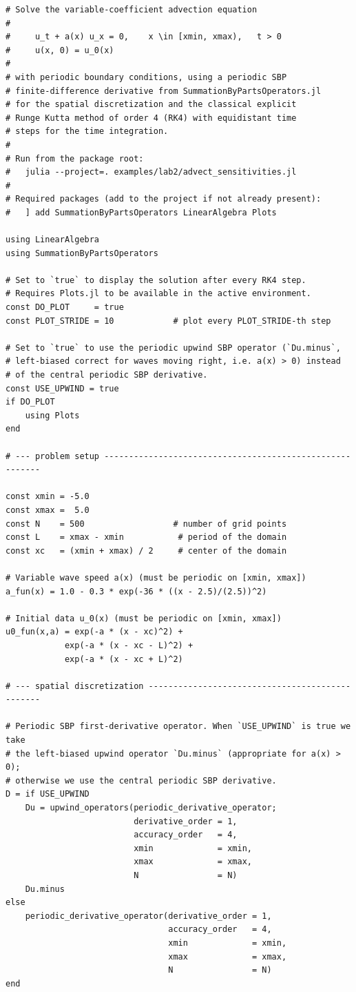 \documentclass[11pt]{report}
\begin{document}
\begin{verbatim}
# Solve the variable-coefficient advection equation
#
#     u_t + a(x) u_x = 0,    x \in [xmin, xmax),   t > 0
#     u(x, 0) = u_0(x)
#
# with periodic boundary conditions, using a periodic SBP
# finite-difference derivative from SummationByPartsOperators.jl
# for the spatial discretization and the classical explicit
# Runge Kutta method of order 4 (RK4) with equidistant time
# steps for the time integration.
#
# Run from the package root:
#   julia --project=. examples/lab2/advect_sensitivities.jl
#
# Required packages (add to the project if not already present):
#   ] add SummationByPartsOperators LinearAlgebra Plots

using LinearAlgebra
using SummationByPartsOperators

# Set to `true` to display the solution after every RK4 step.
# Requires Plots.jl to be available in the active environment.
const DO_PLOT     = true
const PLOT_STRIDE = 10            # plot every PLOT_STRIDE-th step

# Set to `true` to use the periodic upwind SBP operator (`Du.minus`,
# left-biased correct for waves moving right, i.e. a(x) > 0) instead
# of the central periodic SBP derivative.
const USE_UPWIND = true
if DO_PLOT
    using Plots
end

# --- problem setup ---------------------------------------------------------

const xmin = -5.0
const xmax =  5.0
const N    = 500                  # number of grid points
const L    = xmax - xmin           # period of the domain
const xc   = (xmin + xmax) / 2     # center of the domain

# Variable wave speed a(x) (must be periodic on [xmin, xmax])
a_fun(x) = 1.0 - 0.3 * exp(-36 * ((x - 2.5)/(2.5))^2)

# Initial data u_0(x) (must be periodic on [xmin, xmax])
u0_fun(x,a) = exp(-a * (x - xc)^2) +
            exp(-a * (x - xc - L)^2) +
            exp(-a * (x - xc + L)^2)

# --- spatial discretization ------------------------------------------------

# Periodic SBP first-derivative operator. When `USE_UPWIND` is true we take
# the left-biased upwind operator `Du.minus` (appropriate for a(x) > 0);
# otherwise we use the central periodic SBP derivative.
D = if USE_UPWIND
    Du = upwind_operators(periodic_derivative_operator;
                          derivative_order = 1,
                          accuracy_order   = 4,
                          xmin             = xmin,
                          xmax             = xmax,
                          N                = N)
    Du.minus
else
    periodic_derivative_operator(derivative_order = 1,
                                 accuracy_order   = 4,
                                 xmin             = xmin,
                                 xmax             = xmax,
                                 N                = N)
end


\end{verbatim}
\end{document}
